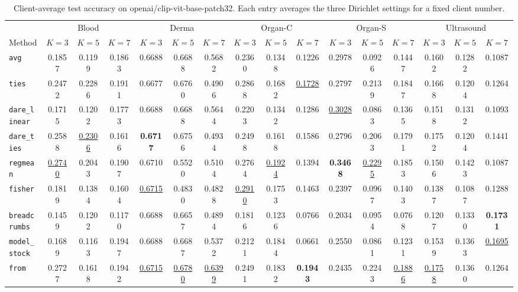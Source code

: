 \begin{table}[t]
\centering
\scriptsize
\setlength{\tabcolsep}{2.6pt}
\caption{Client-average test accuracy on openai/clip-vit-base-patch32. Each entry averages the three Dirichlet settings for a fixed client number.}
\label{tab:client-avg-openai-clip-vit-base-patch32}
\begin{tabular}{lccccccccccccccc}
\toprule
& \multicolumn{3}{c}{Blood} & \multicolumn{3}{c}{Derma} & \multicolumn{3}{c}{Organ-C} & \multicolumn{3}{c}{Organ-S} & \multicolumn{3}{c}{Ultrasound} \\
\cmidrule(lr){2-4}\cmidrule(lr){5-7}\cmidrule(lr){8-10}\cmidrule(lr){11-13}\cmidrule(lr){14-16}
Method & $K=3$ & $K=5$ & $K=7$ & $K=3$ & $K=5$ & $K=7$ & $K=3$ & $K=5$ & $K=7$ & $K=3$ & $K=5$ & $K=7$ & $K=3$ & $K=5$ & $K=7$ \\
\midrule
\texttt{avg} & 0.1857 & 0.1199 & 0.1863 & 0.6688 & 0.6688 & 0.5682 & 0.2360 & 0.1348 & 0.1226 & 0.2978 & 0.0926 & 0.1447 & 0.1602 & 0.1282 & 0.1087 \\
\texttt{ties} & 0.2472 & 0.2286 & 0.1911 & 0.6677 & 0.6760 & 0.4906 & 0.2868 & 0.1682 & \underline{0.1728} & 0.2797 & 0.2139 & 0.1847 & 0.1668 & 0.1204 & 0.1264 \\
\texttt{dare\_linear} & 0.1715 & 0.1202 & 0.1773 & 0.6688 & 0.6688 & 0.5644 & 0.2203 & 0.1342 & 0.1286 & \underline{0.3028} & 0.0863 & 0.1365 & 0.1518 & 0.1312 & 0.1093 \\
\texttt{dare\_ties} & 0.2588 & \underline{0.2306} & 0.1616 & \textbf{0.6717} & 0.6756 & 0.4934 & 0.2498 & 0.1618 & 0.1586 & 0.2796 & 0.2063 & 0.1791 & 0.1752 & 0.1204 & 0.1441 \\
\texttt{regmean} & \underline{0.2740} & 0.2043 & 0.1907 & 0.6710 & 0.5520 & 0.5104 & 0.2764 & \underline{0.1924} & 0.1394 & \textbf{0.3468} & \underline{0.2295} & 0.1853 & 0.1506 & 0.1423 & 0.1087 \\
\texttt{fisher} & 0.1819 & 0.1384 & 0.1604 & \underline{0.6715} & 0.4830 & 0.4828 & \underline{0.2910} & 0.1753 & 0.1463 & 0.2397 & 0.0967 & 0.1403 & 0.1387 & 0.1087 & 0.1288 \\
\texttt{breadcrumbs} & 0.1459 & 0.1202 & 0.1170 & 0.6688 & 0.6657 & 0.4894 & 0.1816 & 0.1236 & 0.0766 & 0.2034 & 0.0954 & 0.0768 & 0.1207 & 0.1330 & \textbf{0.1731} \\
\texttt{model\_stock} & 0.1689 & 0.1163 & 0.1947 & 0.6688 & 0.6687 & 0.5372 & 0.2121 & 0.1844 & 0.0661 & 0.2550 & 0.0861 & 0.1231 & 0.1539 & 0.1363 & \underline{0.1695} \\
\texttt{from} & 0.2727 & 0.1618 & 0.1942 & \underline{0.6715} & \underline{0.6780} & \underline{0.6399} & 0.2491 & 0.1832 & \textbf{0.1943} & 0.2435 & 0.2243 & \underline{0.1886} & \underline{0.1758} & 0.1360 & 0.1264 \\

\end{tabular}
\end{table}
